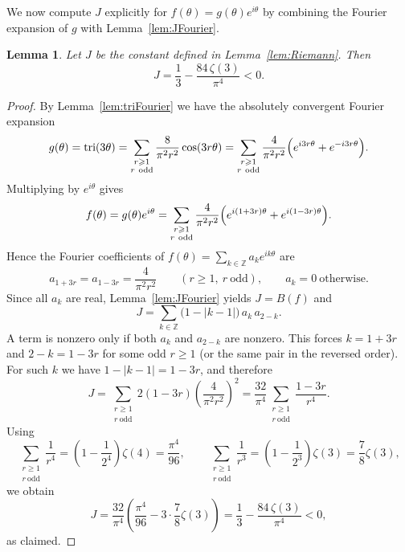 \documentclass{article}
\newtheorem{lem}[thr]{Lemma}
\theoremstyle{definition}
\let\ge\geqslant
\begin{document}
We now compute $J$ explicitly for $f(\theta)=g(\theta)e^{i\theta}$ by combining the Fourier expansion of $g$
with Lemma~\ref{lem:JFourier}.

\begin{lem}\label{lem:Jvalue}
Let $J$ be the constant defined in Lemma~\ref{lem:Riemann}. Then
\[
J=\frac{1}{3}-\frac{84\,\zeta(3)}{\pi^4}<0.
\]
\end{lem}

\begin{proof}
By Lemma~\ref{lem:triFourier} we have the absolutely convergent Fourier expansion
\[
g(\theta)=\mathrm{tri}(3\theta)
=\sum_{\substack{r\ge1\\ r\ \mathrm{odd}}}\frac{8}{\pi^2r^2}\cos(3r\theta)
=\sum_{\substack{r\ge1\\ r\ \mathrm{odd}}}\frac{4}{\pi^2r^2}\Bigl(e^{i3r\theta}+e^{-i3r\theta}\Bigr).
\]
Multiplying by $e^{i\theta}$ gives
\[
f(\theta)=g(\theta)e^{i\theta}
=\sum_{\substack{r\ge1\\ r\ \mathrm{odd}}}\frac{4}{\pi^2r^2}
\Bigl(e^{i(1+3r)\theta}+e^{i(1-3r)\theta}\Bigr).
\]
Hence the Fourier coefficients of $f(\theta)=\sum_{k\in\mathbb Z}a_ke^{ik\theta}$ are
\[
a_{1+3r}=a_{1-3r}=\frac{4}{\pi^2r^2}\qquad(r\ge1,\ r\ \mathrm{odd}),
\qquad a_k=0\ \text{otherwise}.
\]
Since all $a_k$ are real, Lemma~\ref{lem:JFourier} yields $J=B(f)$ and
\[
J=\sum_{k\in\mathbb Z}\bigl(1-|k-1|\bigr)\,a_k\,a_{2-k}.
\]
A term is nonzero only if both $a_k$ and $a_{2-k}$ are nonzero. This forces
$k=1+3r$ and $2-k=1-3r$ for some odd $r\ge1$ (or the same pair in the reversed order).
For such $k$ we have $1-|k-1|=1-3r$, and therefore
\[
J=\sum_{\substack{r\ge1\\ r\ \mathrm{odd}}}2(1-3r)\left(\frac{4}{\pi^2r^2}\right)^2
=\frac{32}{\pi^4}\sum_{\substack{r\ge1\\ r\ \mathrm{odd}}}\frac{1-3r}{r^4}.
\]
Using
\[
\sum_{\substack{r\ge1\\ r\ \mathrm{odd}}}\frac1{r^4}
=\left(1-\frac1{2^4}\right)\zeta(4)=\frac{\pi^4}{96},
\qquad
\sum_{\substack{r\ge1\\ r\ \mathrm{odd}}}\frac1{r^3}
=\left(1-\frac1{2^3}\right)\zeta(3)=\frac{7}{8}\zeta(3),
\]
we obtain
\[
J=\frac{32}{\pi^4}\left(\frac{\pi^4}{96}-3\cdot\frac{7}{8}\zeta(3)\right)
=\frac{1}{3}-\frac{84\,\zeta(3)}{\pi^4}<0,
\]
as claimed.
\end{proof}
\end{document}
